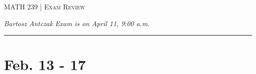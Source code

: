 \documentclass[10pt]{report}
\newcommand{\curDate}{Exam is on April 11, 9:00 a.m.}
\newcommand{\course}{MATH 239}
\begin{document}
\begin{center}
\begin{Large}
\textsc{\course{} | Exam Review}
\end{Large}
\end{center} 
\noindent \textit{Bartosz Antczak} \hfill
\textit{\curDate{}}
\rule{\textwidth}{0.4pt}
\section*{Feb. 13 - 17}

\end{document}
